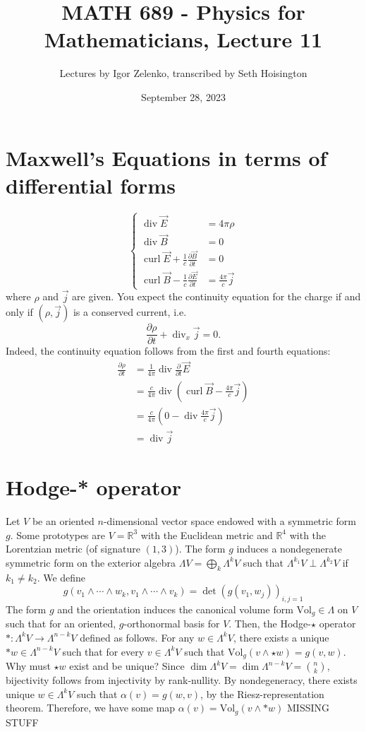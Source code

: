 \documentclass{article}
\title{MATH 689 - Physics for Mathematicians, Lecture 11}
\author{Lectures by Igor Zelenko, transcribed by Seth Hoisington}
\date{September 28, 2023}
\newcommand{\R}{\mathbb R}
\newcommand{\nl}{\newline\newline\noindent}
\newcommand{\al}{\alpha}
\newcommand{\pd}[1]{\frac{\partial}{\partial #1}}
\newcommand{\pdof}[2]{\frac{\partial #1}{\partial #2}}
\DeclareMathOperator{\Div}{div}
\DeclareMathOperator{\curl}{curl}
\begin{document}
\maketitle

\section{Maxwell's Equations in terms of differential forms}
\[\left\{\begin{aligned}
    \Div \vec E &=4\pi\rho\\
    \Div \vec B &=0\\
    \curl \vec E + \frac{1}{c}\pdof{\vec B}{t} &= 0\\
    \curl \vec B - \frac{1}{c}\pdof{\vec E}{t} &= \frac{4\pi}{c}\vec j
\end{aligned}\right.\]
where $\rho$ and $\vec j$ are given. You expect the continuity equation for the charge if and only if $(\rho,\vec j)$ is a conserved current, i.e. 
\[\pdof{\rho}{t}+\Div_x\vec j = 0.\]
Indeed, the continuity equation follows from the first and fourth equations:
\begin{align*}
    \pdof{\rho}{t}&=\frac{1}{4\pi}\Div\pd{t}\vec E\\
    &=\frac{c}{4\pi}\Div\left(\curl\vec B - \frac{4\pi}{c}\vec j\right)\\
    &=\frac{c}{4\pi}\left(0 - \Div\frac{4\pi}{c}\vec j\right)\\
    &=\Div \vec j
\end{align*}
\section{Hodge-* operator}
Let $V$ be an oriented $n$-dimensional vector space endowed with a symmetric form $g$. Some prototypes are $V=\R^3$ with the Euclidean metric and $\R^4$ with the Lorentzian metric (of signature $(1,3)$).
\nl
The form $g$ induces a nondegenerate symmetric form on the exterior algebra $\Lambda V = \bigoplus_k \Lambda^kV$ such that $\Lambda^{k_1}V\perp \Lambda^{k_2}V$ if $k_1\neq k_2$. We define
\[g(v_1\wedge \cdots \wedge w_k, v_1\wedge\cdots \wedge v_k) = \det(g(v_1,w_j))_{i,j=1}\]
The form $g$ and the orientation induces the canonical volume form $\text{Vol}_g\in\Lambda$ on $V$ such that for an oriented, $g$-orthonormal basis for $V$.
\nl
Then, the Hodge-$\star$ operator $*:\Lambda^kV\to \Lambda^{n-k}V$ defined as follows. For any $w\in \Lambda^kV$, there exists a unique $*w\in \Lambda^{n-k}V$ such that for every $v\in \Lambda^kV$ such that $\text{Vol}_g(v\wedge\star w) = g(v,w)$. 
\nl
Why must $\star w$ exist and be unique? Since $\dim\Lambda^kV = \dim\Lambda^{n-k}V = \binom{n}{k}$, bijectivity follows from injectivity by rank-nullity. By nondegeneracy, there exists unique $w\in \Lambda^kV$ such that $\al(v) = g(w,v)$, by the Riesz-representation theorem. Therefore, we have some map $\al(v) = \text{Vol}_g(v\wedge *w)$
MISSING STUFF
\end{document}
